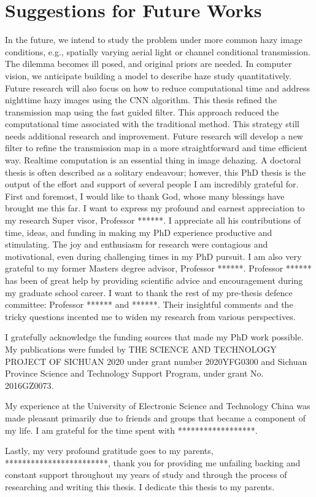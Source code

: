 \documentclass[doctor,english,listoffigures,listoftables]{thesis-uestc}
\begin{document}
\section{Suggestions for Future Works}
In the future, we intend to study the problem under more common hazy image conditions, e.g., spatially varying aerial light or channel conditional transmission. The dilemma becomes ill posed, and original priors are needed. In computer vision, we anticipate building a model to describe haze study quantitatively. Future research will also focus on how to reduce computational time and address nighttime hazy images using the CNN algorithm. This thesis refined the transmission map using the fast guided filter. This approach reduced the computational time associated with the traditional method. This strategy still needs additional research and improvement. Future research will develop a new filter to refine the transmission map in a more straightforward and time efficient way. Real­time computation is an essential thing in image dehazing.
\thesisacknowledgement
A doctoral thesis is often described as a solitary endeavour; however, this PhD thesis is the output of the effort and support of several people I am incredibly grateful for.
First and foremost, I would like to thank God, whose many blessings have brought me this far. I want to express my profound and earnest appreciation to my research Super­ visor, Professor ******. I appreciate all his contributions of time, ideas, and funding in making my PhD experience productive and stimulating. The joy and enthusiasm for research were contagious and motivational, even during challenging times in my PhD pursuit. I am also very grateful to my former Masters degree advisor, Professor ******. Professor ****** has been of great help by providing scientific advice and encourage­ment during my graduate school career. I want to thank the rest of my pre-thesis defence committee: Professor ****** and ******. Their insightful comments and the tricky questions incented me to widen my research from various perspectives.\par
I gratefully acknowledge the funding sources that made my PhD work possible. My publications were funded by THE SCIENCE AND TECHNOLOGY PROJECT OF SICHUAN 2020 under grant number 2020YFG0300 and Sichuan Province Science and Technology Support Program, under grant No. 2016GZ0073.\par
My experience at the University of Electronic Science and Technology China was made pleasant primarily due to friends and groups that became a component of my life. I am grateful for the time spent with ******************.\par
Lastly, my very profound gratitude goes to my parents, ************************, thank you for providing me unfailing backing and constant support throughout my years of study and through the process of researching and writing this thesis. I dedicate this thesis to my parents.

\nocite{*}

%
% 
%
%
%
%

\thesisappendix
{}
\end{document}
